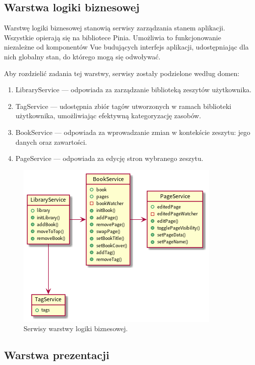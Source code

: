 \subsection{Warstwa logiki biznesowej}
Warstwę logiki biznesowej stanowią serwisy zarządzania stanem aplikacji.
Wszystkie opierają się na bibliotece Pinia.
Umożliwia to funkcjonowanie niezależne od komponentów Vue budujących interfejs aplikacji,
udostępniając dla nich globalny stan, do którego mogą się odwoływać.

Aby rozdzielić zadania tej warstwy, serwisy zostały podzielone według domen:
\begin{enumerate}
	\item LibraryService — odpowiada za zarządzanie biblioteką zeszytów użytkownika.
	\item TagService — udostępnia zbiór tagów utworzonych w ramach biblioteki użytkownika, umożliwiając efektywną kategoryzację zasobów.
	\item BookService — odpowiada za wprowadzanie zmian w kontekście zeszytu: jego danych oraz zawartości.
	\item PageService — odpowiada za edycję stron wybranego zeszytu.
\end{enumerate}

\begin{figure}[H]
	\begin{center}
		\includegraphics[scale=0.9]{media/LogicLayer.png}
	\end{center}
	\caption{Serwisy warstwy logiki biznesowej.}
	\label{rys:logic-layer}
\end{figure}


\subsection{Warstwa prezentacji}
